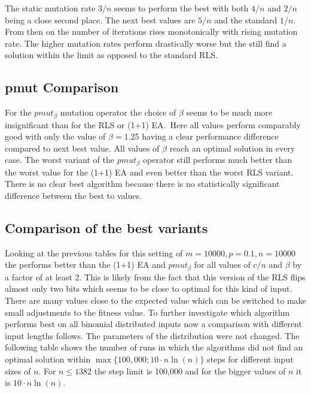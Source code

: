 
The static mutation rate $3/n$ seems to perform the best with both $4/n$ and $2/n$ being a close second place.
The next best values are $5/n$ and the standard $1/n$.
From then on the number of iterations rises monotonically with rising mutation rate.
The higher mutation rates perform drastically worse but the still find a solution within the limit as opposed to the standard RLS.\
\subsection{pmut Comparison}

For the $pmut_\beta$ mutation operator the choice of $\beta$ seems to be much more insignificant than for the RLS or (1+1) EA.\
Here all values perform comparably good with only the value of $\beta = 1.25$ having a clear performance difference compared to next best value.
All values of $\beta$ reach an optimal solution in every case.
The worst variant of the $pmut_\beta$ operator still performs much better than the worst value for the (1+1) EA and even better than the worst RLS variant.
There is no clear best algorithm because there is no statistically significant difference between the best to values.
\subsection{Comparison of the best variants}
Looking at the previous tables for this setting of $m=10000, p=0.1, n=10000$ the \RLSN[2] performs better than the  (1+1) EA and $pmut_\beta$ for all values of $c/n$ and $\beta$ by a factor of at least 2.
This is likely from the fact that this version of the RLS flips almost only two bits which seems to be close to optimal for this kind of input.
There are many values close to the expected value which can be switched to make small adjustments to the fitness value.
To further investigate which algorithm performs best on all binomial distributed inputs now a comparison with different input lengths follows.
The parameters of the distribution were not changed.\newline
The following table shows the number of runs in which the algorithms did not find an optimal solution within $\max\{100,000;10 \cdot n\ln(n)\}$ steps for different input sizes of $n$.
For $n\le1382$ the step limit is 100,000 and for the bigger values of $n$ it is $10 \cdot n\ln(n)$.



